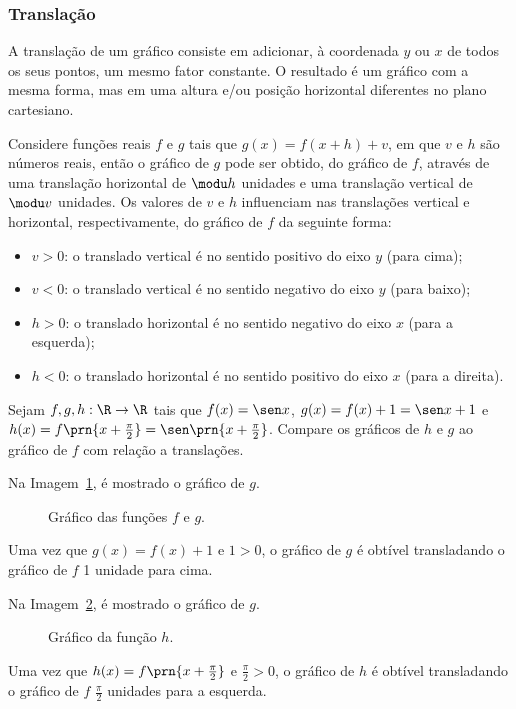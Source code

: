 \subsubsection{Translação}

A translação de um gráfico consiste em adicionar, à coordenada $y$ ou $x$ de todos os seus pontos, um mesmo fator constante.
O resultado é um gráfico com a mesma forma, mas em uma altura e/ou posição horizontal diferentes no plano cartesiano.

Considere funções reais $f$ e $g$ tais que $g(x) = f(x+h) + v$, em que $v$ e $h$ são números reais,
então o gráfico de $g$ pode ser obtido, do gráfico de $f$, através
de uma translação horizontal de $\modu h$ unidades e uma
translação vertical de $\modu v$ unidades.
Os valores de $v$ e $h$ influenciam nas translações vertical e horizontal, respectivamente, do gráfico de $f$ da seguinte forma:

\begin{itemize}
  \item $v > 0$: o translado vertical é no sentido positivo do eixo $y$ (para cima);
  \item $v < 0$: o translado vertical é no sentido negativo do eixo $y$ (para baixo);
  \item $h > 0$: o translado horizontal é no sentido negativo do eixo $x$ (para a esquerda);
  \item $h < 0$: o translado horizontal é no sentido positivo do eixo $x$ (para a direita).
\end{itemize}

\begin{example}
Sejam $f,g,h:\R \to \R$ tais que $f(x) = \sen x$, $g(x) = f(x) + 1 = \sen x +1$ e $h(x)= f\prn{x+\frac {\pi} 2}= \sen \prn{x+ \frac {\pi} 2}$.
Compare os gráficos de $h$ e $g$ ao gráfico de $f$ com relação a translações.
\end{example}

\begin{solution}
Na Imagem~\ref{img:grafico-translacao-exemplo-g}, é mostrado o gráfico de $g$.
%
  \begin{figure}
    \centering
    
    \caption{Gráfico das funções $f$ e $g$.}
    \label{img:grafico-translacao-exemplo-g}
  \end{figure}
%
\noindent Uma vez que $g(x) = f(x)+1$ e $1>0$, o gráfico de $g$ é obtível transladando o gráfico de $f$ 1 unidade para cima.

Na Imagem~\ref{img:grafico-translacao-exemplo-h}, é mostrado o gráfico de $g$.
%
  \begin{figure}
    \centering
    
    \caption{Gráfico da função $h$.}
    \label{img:grafico-translacao-exemplo-h}
  \end{figure}
%
\noindent Uma vez que $h(x) = f\prn{x+\frac {\pi} 2}$ e $\frac {\pi} 2>0$, o gráfico de $h$ é obtível transladando o gráfico de $f$ $\frac {\pi} 2$ unidades para a esquerda.
\end{solution}    